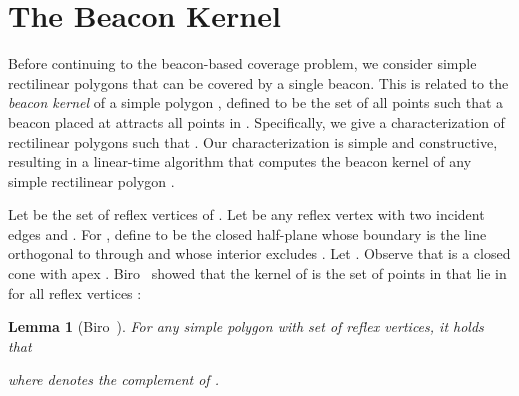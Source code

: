 \documentclass[11pt]{article}
\newtheorem{lemma}{Lemma}
\theoremstyle{definition}
\begin{document}
\section{The Beacon Kernel} \label{sec:kernel}


Before continuing to the beacon-based coverage problem,
we consider simple rectilinear polygons that can be covered by a single beacon.
This is related to the  \emph{beacon kernel}  of a simple polygon ,
defined to be the set of all points 
such that a beacon placed at  attracts all points in .
Specifically, we give a characterization of rectilinear polygons  such that .
Our characterization is  simple and constructive, resulting in a linear-time algorithm
that computes the beacon kernel  of any simple rectilinear polygon .

Let  be the set of reflex vertices of . Let  be any reflex vertex with
two incident edges  and . 
For ,
define  to be the closed half-plane whose boundary is the line orthogonal to  through 
and whose interior excludes .
Let .
Observe that  is a closed cone with apex .
Biro~\cite[Theorem 5.2.8]{b-bbrg-13} showed that the kernel  of 
is the set of points in  that lie in  for all reflex vertices :
\begin{lemma}[Biro~\cite{b-bbrg-13}] \label{lem:kernel_biro}
 For any simple polygon  with set  of reflex vertices, it holds that
 
 where  denotes the complement of . 
\end{lemma}
\end{document}
